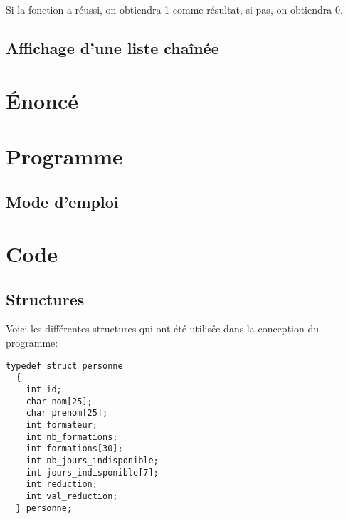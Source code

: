 \documentclass[11pt]{article}
\begin{document}
Si la fonction a réussi, on obtiendra 1 comme résultat, si pas, on obtiendra 0.

\subsection{Affichage d'une liste chaînée}

\newpage
\section{Énoncé}

\newpage
\section{Programme}
\subsection{Mode d'emploi}

\newpage
\section{Code}
\subsection{Structures}
Voici les différentes structures qui ont été utilisée dans la conception du programme:

\begin{lstlisting}[firstnumber=30]
  typedef struct personne
  {
    int id;
    char nom[25];
    char prenom[25];
    int formateur;
    int nb_formations;
    int formations[30];
    int nb_jours_indisponible;
    int jours_indisponible[7];
    int reduction;
    int val_reduction;
  } personne;
\end{lstlisting}
\end{document}
